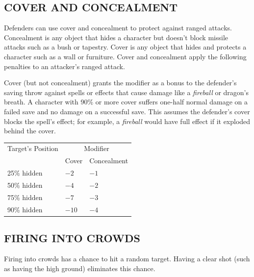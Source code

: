 \begin{multicols}{2}
\subsection{COVER AND CONCEALMENT}

Defenders can use cover and concealment to protect against ranged attacks.  Concealment is any object that hides a character but doesn't block missile attacks such as a bush or tapestry.  Cover is any object that hides and protects a character such as a wall or furniture.  Cover and concealment apply the following penalties to an attacker's ranged attack.

Cover (but not concealment) grants the modifier as a bonus to the defender's saving throw against spells or effects that cause damage like a \textit{fireball} or dragon's breath.  A character with 90\% or more cover suffers one-half normal damage on a failed save and no damage on a successful save.  This assumes the defender's cover blocks the spell's effect; for example, a \textit{fireball} would have full effect if it exploded behind the cover.

\noindent
\begin{minipage}{\columnwidth}

\label{covermods}
\noindent
\begin{tabular}{|m{}|m{}|m{}|}
\hline
Target's Position	& \multicolumn{2}{c|}{Modifier} \\
&	Cover	& Concealment \\
\hline\hline
\rowcolor[gray]{.9}25\% hidden	& $-2$	& $-1$ \\
50\% hidden	& $-4$	& $-2$ \\
\rowcolor[gray]{.9}75\% hidden	& $-7$	& $-3$ \\
90\% hidden	& $-10$	& $-4$ \\
\hline
\end{tabular}

\end{minipage}

\subsection{FIRING INTO CROWDS}

Firing into crowds has a chance to hit a random target.  Having a clear shot (such as having the high ground) eliminates this chance. 


\end{multicols}
